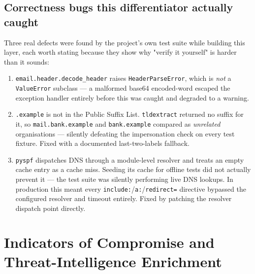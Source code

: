\documentclass[11pt,a4paper]{article}
\begin{document}
\subsection{Correctness bugs this differentiator actually caught}
Three real defects were found by the project's own test suite while building this layer, each
worth stating because they show why "verify it yourself" is harder than it sounds:
\begin{enumerate}[leftmargin=1.4em]
  \item \texttt{email.header.decode\_header} raises \texttt{HeaderParseError}, which is
    \emph{not} a \texttt{ValueError} subclass — a malformed base64 encoded-word escaped the
    exception handler entirely before this was caught and degraded to a warning.
  \item \texttt{.example} is not in the Public Suffix List. \texttt{tldextract} returned no
    suffix for it, so \texttt{mail.bank.example} and \texttt{bank.example} compared as
    \emph{unrelated} organisations — silently defeating the impersonation check on every
    test fixture. Fixed with a documented last-two-labels fallback.
  \item \texttt{pyspf} dispatches DNS through a module-level resolver and treats an empty
    cache entry as a cache miss. Seeding its cache for offline tests did not actually prevent
    it — the test suite was silently performing live DNS lookups. In production this meant
    every \texttt{include:}/\texttt{a:}/\texttt{redirect=} directive bypassed the configured
    resolver and timeout entirely. Fixed by patching the resolver dispatch point directly.
\end{enumerate}

\section{Indicators of Compromise and Threat-Intelligence Enrichment}
\end{document}
